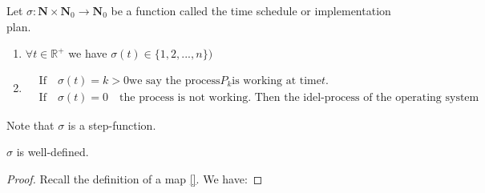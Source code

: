 \begin{definition}
Let $\sigma: \mathbf{N} \times \mathbf{N}_0 \rightarrow \mathbf{N}_0$ be a function called the time schedule or implementation plan.
\begin{enumerate}
\item $\forall t \in \mathbb{R}^+$ we have $\sigma(t)\in \{1,2,...,n\})$
\item \begin{align*}
		&\text{If} \quad \sigma(t) = k > 0  \text{we say the process} P_k \text{is working at time}t.\\
		&\text{If} \quad \sigma(t)= 0 \quad  \text{the process is not working. Then the idel-process of the operating system is working.} 	
	\end{align*}
\end{enumerate}
\end{definition}

\begin{remark}
Note that $\sigma$ is a step-function. 
\end{remark}

\begin{lemma}
 $\sigma$ is well-defined.
\end{lemma}
\begin{proof}
Recall the definition of a map \ref{}. We have:
\end{proof}

